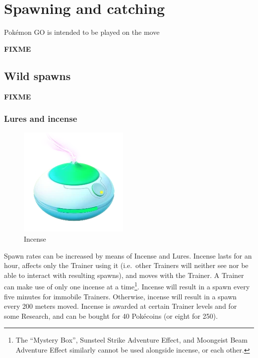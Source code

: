 \chapter{Spawning and catching}
Pokémon GO is intended to be played on the move

\label{chap:spawn}
\textbf{FIXME}

\section{Wild spawns}
\label{sec:spawns}
\textbf{FIXME}

\subsection{Lures and incense}
\begin{figure}
  \center
  \includegraphics[width=.25\textwidth]{images/incense.png}
  \caption*{Incense}
\end{figure}
Spawn rates can be increased by means of Incense and Lures.
Incense lasts for an hour, affects only the Trainer using it (i.e.\ other Trainers
  will neither see nor be able to interact with resulting spawns),
  and moves with the Trainer.
A Trainer can make use of only one incense at a time\footnote{The
  ``Mystery Box'', Sunsteel Strike Adventure Effect, and
  Moongeist Beam Adventure Effect similarly cannot be used
  alongside incense, or each other.}.
Incense will result in a spawn every five minutes for immobile Trainers.
Otherwise, incense will result in a spawn every 200 meters moved.
Incense is awarded at certain Trainer levels and for some Research,
  and can be bought for 40 Pokécoins (or eight for 250).

